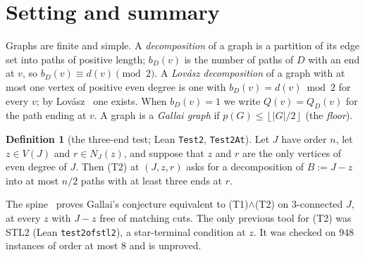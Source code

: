 \documentclass[11pt]{amsart}
\theoremstyle{definition}
\newtheorem{definition}[theorem]{Definition}
\theoremstyle{remark}
\renewcommand{\_}{\oldunderscore\allowbreak}
\newcommand{\fl}[1]{\left\lfloor #1\right\rfloor}
\begin{document}
\begin{abstract}
\emph{Computed.} The general forest base exists at all $717{,}942$ instances. At four of them,
$J-z$ is a fat theta ($K_{2,7}$ and a relative). There the base needs $r$ to be a child in the
forest, and no rooting at $r$ works.

The cone tests at non-apex vertices are (T2) for the base graph with one vertex made universal.
In the data ($n\le10$) they are tight exactly at semi-cliques; only the direction ``semi-clique
$\Rightarrow$ tight'' is proved. All $20$ tight instances above are cones.
\end{abstract}

\maketitle

\section{Setting and summary}\label{sec:setting}

Graphs are finite and simple. A \emph{decomposition} of a graph is a partition of its edge set into
paths of positive length; $b_D(v)$ is the number of paths of $D$ with an end at $v$, so
$b_D(v)\equiv d(v)\pmod 2$. A \emph{Lov\'asz decomposition} of a graph with at most one vertex of
positive even degree is one with $b_D(v)=d(v)\bmod 2$ for every $v$; by Lov\'asz~\cite{L68} one
exists. When $b_D(v)=1$ we write $Q(v)=Q_D(v)$ for the path ending at $v$. A graph is a
\emph{Gallai graph} if $p(G)\le\fl{|G|/2}$ (the \emph{floor}).

\begin{definition}[the three-end test; Lean \texttt{Test2}, \texttt{Test2At}]\label{def:t2}
Let $J$ have order $n$, let $z\in V(J)$ and $r\in N_J(z)$, and suppose that $z$ and $r$ are the only
vertices of even degree of $J$. Then (T2) at $(J,z,r)$ asks for a decomposition of $B:=J-z$ into at
most $n/2$ paths with at least three ends at $r$.
\end{definition}

The spine~\cite{SPINE} proves Gallai's conjecture equivalent to (T1)$\wedge$(T2) on $3$-connected
$J$, at every $z$ with $J-z$ free of matching cuts. The only previous tool for (T2) was STL2
(Lean \texttt{test2\_of\_stl2}), a star-terminal condition at $z$. It was checked on $948$
instances of order at most $8$ and is unproved.
\end{document}
